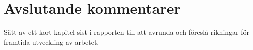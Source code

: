 \chapter{Avslutande kommentarer}\label{cha:conclusions}
%
Sätt av ett kort kapitel sist i rapporten till att avrunda och föreslå rikningar för framtida utveckling av arbetet.
